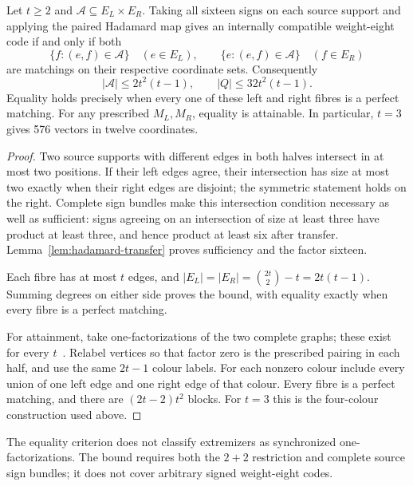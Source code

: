 \begin{proposition}\label{prop:local36-paper}
Let $t\ge2$ and $\mathcal A\subseteq E_L\times E_R$. Taking all sixteen
signs on each source support and applying the paired Hadamard map gives
an internally compatible weight-eight code if and only if both
\[
 \{f:(e,f)\in\mathcal A\}\quad(e\in E_L),\qquad
 \{e:(e,f)\in\mathcal A\}\quad(f\in E_R)
\]
are matchings on their respective coordinate sets. Consequently
\begin{equation}\label{eq:transverse-capacity}
 |\mathcal A|\le2t^2(t-1),\qquad |Q|\le32t^2(t-1).
\end{equation}
Equality holds precisely when every one of these left and right
fibres is a perfect matching. For any prescribed $M_L,M_R$, equality
is attainable. In particular, $t=3$ gives 576 vectors in twelve coordinates.
\end{proposition}
\begin{proof}
Two source supports with different edges in both halves intersect in
at most two positions. If their left edges agree, their intersection
has size at most two exactly when their right edges are disjoint;
the symmetric statement holds on the right. Complete sign bundles
make this intersection condition necessary as well as sufficient:
signs agreeing on an intersection of size at least three have product
at least three, and hence product at least six after transfer.
Lemma~\ref{lem:hadamard-transfer} proves sufficiency and the factor sixteen.

Each fibre has at most $t$ edges, and
$|E_L|=|E_R|=\binom{2t}{2}-t=2t(t-1)$.
Summing degrees on either side proves the bound, with equality exactly
when every fibre is a perfect matching.

For attainment, take one-factorizations of the two complete graphs;
these exist for every $t$~\cite[p.~137]{kalbfleisch-stanton}. Relabel
vertices so that factor zero is the prescribed pairing in each half,
and use the same $2t-1$ colour labels. For each nonzero colour include
every union of one left edge and one right edge of that colour.
Every fibre is a perfect matching, and there are $(2t-2)t^2$ blocks.
For $t=3$ this is the four-colour construction used above.
\end{proof}

The equality criterion does not classify extremizers as synchronized
one-factorizations. The bound requires both the $2+2$ restriction and
complete source sign bundles; it does not cover arbitrary signed
weight-eight codes.

